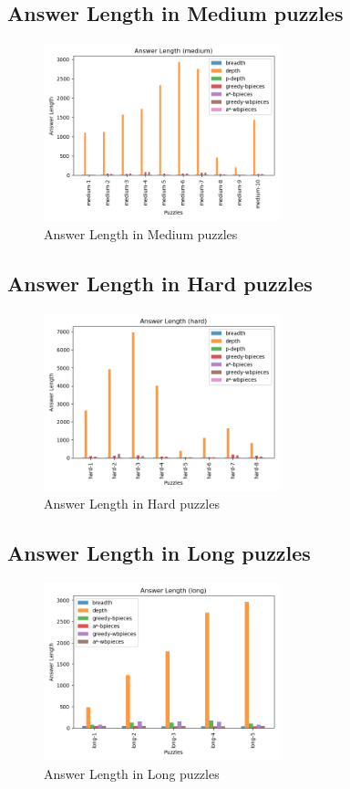 \documentclass[conference]{IEEEtran}
\begin{document}
\subsection{Answer Length in Medium puzzles}
\begin{figure}[H]
    \centerline{\includegraphics[width=260px]{../../graphics/answerLength-medium.png}}
    \caption{Answer Length in Medium puzzles}
\end{figure}

\subsection{Answer Length in Hard puzzles}
\begin{figure}[H]
    \centerline{\includegraphics[width=260px]{../../graphics/answerLength-hard.png}}
    \caption{Answer Length in Hard puzzles}
\end{figure}

\subsection{Answer Length in Long puzzles}
\begin{figure}[H]
    \centerline{\includegraphics[width=260px]{../../graphics/answerLength-long.png}}
    \caption{Answer Length in Long puzzles}
\end{figure}
\end{document}
